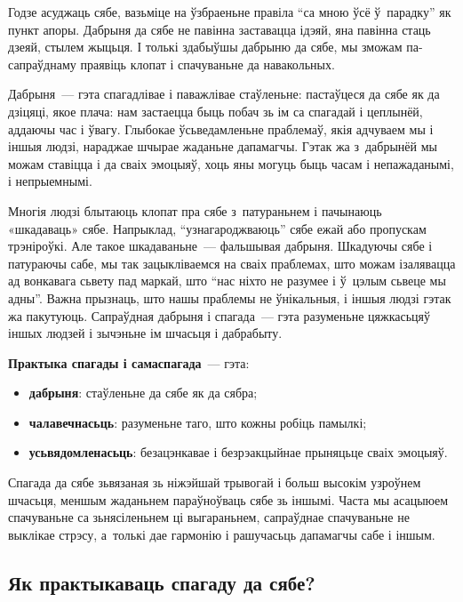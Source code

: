 Годзе асуджаць сябе, вазьміце на ўзбраеньне правіла ``са мною ўсё ў~парадку'' як пункт апоры. Дабрыня да сябе не павінна заставацца ідэяй, яна павінна стаць дзеяй, стылем жыцьця. І толькі здабыўшы дабрыню да сябе, мы зможам па-сапраўднаму праявіць клопат і спачуваньне да навакольных.

Дабрыня~--- гэта спагадлівае і паважлівае стаўленьне: пастаўцеся да сябе як да дзіцяці, якое плача: нам застаецца быць побач зь ім са спагадай і цеплынёй, аддаючы час і ўвагу. Глыбокае ўсьведамленьне праблемаў, якія адчуваем мы і іншыя людзі, нараджае шчырае жаданьне дапамагчы. Гэтак жа з~дабрынёй мы можам ставіцца і да сваіх эмоцыяў, хоць яны могуць быць часам і непажаданымі, і непрыемнымі.

Многія людзі блытаюць клопат пра сябе з~патураньнем і пачынаюць «шкадаваць» сябе. Напрыклад, ``узнагароджваюць'' сябе ежай або пропускам трэніроўкі. Але такое шкадаваньне~--- фальшывая дабрыня. Шкадуючы сябе і патураючы сабе, мы так зацыкліваемся на сваіх праблемах, што можам ізалявацца ад вонкавага сьвету пад маркай, што ``нас ніхто не разумее і ў~цэлым сьвеце мы адны''. Важна прызнаць, што нашы праблемы не ўнікальныя, і іншыя людзі гэтак жа пакутуюць. Сапраўдная дабрыня і спагада~--- гэта разуменьне цяжкасьцяў іншых людзей і зычэньне ім шчасьця і дабрабыту.

\textbf{Практыка спагады і самаспагада}~--- гэта: 
\begin{itemize}
  \item \textbf{дабрыня}: стаўленьне да сябе як да сябра;
  \item \textbf{чалавечнасьць}: разуменьне таго, што кожны робіць памылкі;
  \item \textbf{усьвядомленасьць}: безацэнкавае і безрэакцыйнае прыняцьце сваіх эмоцыяў.
\end{itemize}


Спагада да сябе зьвязаная зь ніжэйшай трывогай і больш высокім узроўнем шчасьця, меншым жаданьнем параўноўваць сябе зь іншымі. Часта мы асацыюем спачуваньне са зьнясіленьнем ці выгараньнем, сапраўднае спачуваньне не выклікае стрэсу, а~толькі дае гармонію і рашучасьць дапамагчы сабе і іншым.

\subsection*{Як практыкаваць спагаду да сябе?}

